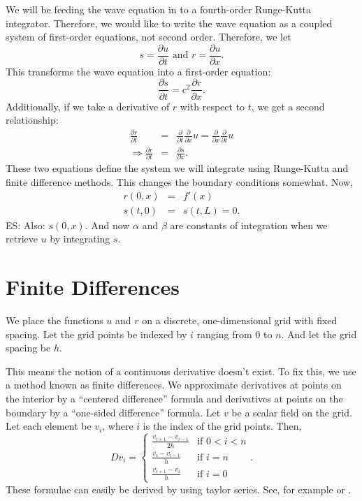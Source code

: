 \documentclass[]{article}
\begin{document}
We will be feeding the wave equation in to a fourth-order Runge-Kutta
integrator. Therefore, we would like to write the wave equation as a
coupled system of first-order equations, not second order. Therefore, we let
\begin{equation}
  \label{eq:r:s:def}
  s = \frac{\partial u}{\partial t}\text{ and }r = \frac{\partial u}{\partial x}.
\end{equation}
This transforms the wave equation into a first-order equation:
\begin{equation}
  \label{eq:wave:transformed:1}
  \frac{\partial s}{\partial t} = c^2 \frac{\partial r}{\partial x}.
\end{equation}
Additionally, if we take a derivative of $r$ with respect to $t$, we
get a second relationship:
\begin{eqnarray}
  \label{eq:wave:transformed:2}
  \frac{\partial r}{\partial t} &=& \frac{\partial}{\partial t}\frac{\partial }{\partial x}u = \frac{\partial }{\partial x}\frac{\partial }{\partial t}u\nonumber\\
  \Rightarrow \frac{\partial r}{\partial t} &=& \frac{\partial s}{\partial x}.
\end{eqnarray}
These two equations define the system we will integrate using
Runge-Kutta and finite difference methods. This changes the boundary
conditions somewhat. Now,
\begin{eqnarray}
  \label{eq:boundary:conditions:r:s}
  r(0,x) &=& f'(x)\\
  s(t,0) &=& s(t,L) = 0.
\end{eqnarray}
ES: Also: $s(0,x)$.
And now $\alpha$ and $\beta$ are constants of integration when we
retrieve $u$ by integrating $s$.

\section{Finite Differences}

We place the functions $u$ and $r$ on a discrete, one-dimensional grid
with fixed spacing. Let the grid points be indexed by $i$ ranging from
0 to $n$. And let the grid spacing be $h$.

This means the notion of a continuous derivative
doesn't exist. To fix this, we use a method known as finite
differences. We approximate derivatives at points on the interior by a
``centered difference'' formula and derivatives at points on the
boundary by a ``one-sided difference'' formula. Let $v$ be a scalar
field on the grid. Let each element be $v_i$, where $i$ is the index
of the grid points. Then,
\begin{equation}
  \label{eq:derivative:operator}
  D v_i = \begin{cases}
    \frac{v_{i+1} - v_{i-1}}{2h}&\text{if }0 < i < n\\
    \frac{v_i-v_{i-1}}{h}&\text{if }i = n\\
    \frac{v_{i+1}-v_i}{h}&\text{if }i = 0
  \end{cases}.
\end{equation}
These formulae can easily be derived by using taylor series. See, for
example \cite{wikifinitedifferences} or \cite{Heath}.
\end{document}
